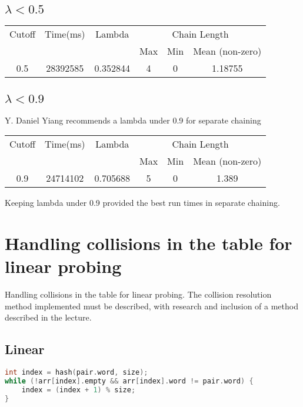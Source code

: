 \documentclass[12pt]{article}
\begin{document}
\subsection{$\lambda < 0.5$}
\begin{center}
\begin{tabular}{|c|c|c|c|c|c|}
\hline
Cutoff & Time(ms) & Lambda & \multicolumn{3}{|c|}{Chain Length} \\
 & & & Max & Min & Mean (non-zero) \\
\hline
0.5 & 28392585 & 0.352844 & 4 & 0 & 1.18755 \\
\hline
\end{tabular}
\end{center}

\subsection{$\lambda < 0.9$}
Y. Daniel Yiang recommends a lambda under 0.9 for separate chaining
\begin{center}
\begin{tabular}{|c|c|c|c|c|c|}
\hline
Cutoff & Time(ms) & Lambda & \multicolumn{3}{|c|}{Chain Length} \\
 & & & Max & Min & Mean (non-zero) \\
\hline
0.9 & 24714102 & 0.705688 & 5 & 0 & 1.389 \\
\hline
\end{tabular}
\end{center}

Keeping lambda under 0.9 provided the best run times in separate chaining.

\section{Handling collisions in the table for linear probing}
Handling collisions in the table for linear probing. The collision resolution method implemented must be
described, with research and inclusion of a method described in the lecture.

\subsection{Linear}
\begin{lstlisting}[language=C++]
int index = hash(pair.word, size);
while (!arr[index].empty && arr[index].word != pair.word) {
    index = (index + 1) % size;
}
\end{lstlisting}
\end{document}
